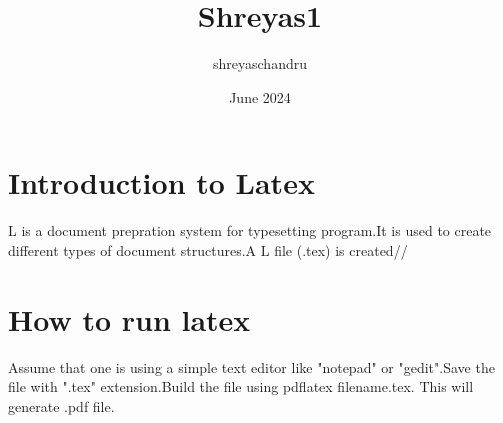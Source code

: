 \documentclass[a5paper,50pt]{article}
\title{Shreyas1}
\author{shreyaschandru }
\date{June 2024}
\begin{document}
\section{Introduction to Latex}
 L is a document prepration system for typesetting program.It is used to create different types of document structures.A L file (.tex) is created// 

\section{How to run latex}
Assume that one is using a simple text editor like "notepad" or "gedit".Save the file with ".tex" extension.Build the file using pdflatex filename.tex. This will generate .pdf file.\\
\end{document}
